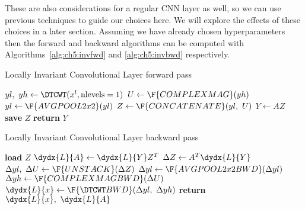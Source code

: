 These are also considerations for a regular CNN layer as well, so we can use
previous techniques to guide our choices here. We will explore the effects of
these choices in a later section. Assuming we have already chosen
hyperparameters then the forward and backward algorithms can be computed with
Algorithms~\autoref{alg:ch5:invfwd} and \autoref{alg:ch5:invbwd} respectively.

\begin{algorithm}[t]
\caption{Locally Invariant Convolutional Layer forward
pass}\label{alg:ch5:invfwd}
\begin{algorithmic}[1]
  \State $yl,\ yh \gets \DTCWT(x^l, \mbox{nlevels}=1) $ 
  \State $U \gets \F{COMPLEXMAG}(yh)$
  \State $yl \gets \F{AVGPOOL2x2}(yl)$  
  \State $Z \gets \F{CONCATENATE}(yl,\ U)$ 
  \State $Y \gets AZ$ 
  \State \textbf{save} $Z$ 
  \State \textbf{return} $Y$ 
\EndProcedure
\end{algorithmic}
\end{algorithm}

\begin{algorithm}[t]
\caption{Locally Invariant Convolutional Layer backward
pass}\label{alg:ch5:invbwd}
\begin{algorithmic}[1]
  \State \textbf{load} $Z$
  \State $\dydx{L}{A} \gets \dydx{L}{Y} Z^T$
  \State $\Delta{Z} \gets A^T\dydx{L}{Y}$
  \State $\Delta yl,\ \Delta U \gets \F{UNSTACK}(\Delta Z)$ 
  \State $\Delta yl \gets \F{AVGPOOL2x2BWD}(\Delta yl)$
  \State $\Delta yh \gets \F{COMPLEXMAGBWD}(\Delta U)$
  \State $\dydx{L}{x} \gets \F{\DTCWT BWD}(\Delta yl,\ \Delta yh)$
  \State \textbf{return} $\dydx{L}{x},\ \dydx{L}{A}$
\EndProcedure
\end{algorithmic}
\end{algorithm}
